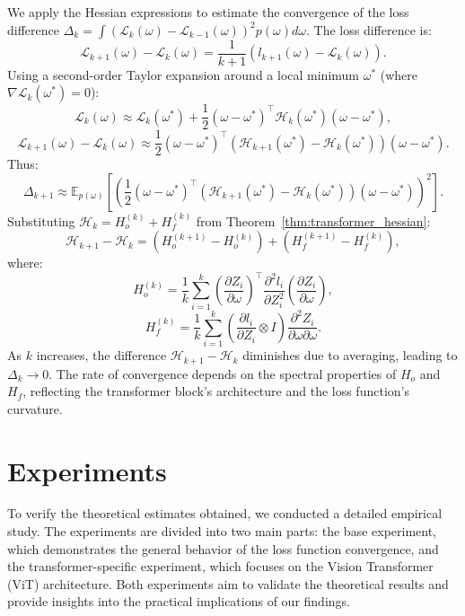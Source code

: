 \documentclass{article}
\begin{document}
We apply the Hessian expressions to estimate the convergence of the loss difference \( \Delta_k = \int ( \mathcal{L}_k(\omega) - \mathcal{L}_{k-1}(\omega) )^2 p(\omega) d\omega \). The loss difference is:
\[
\mathcal{L}_{k+1}(\omega) - \mathcal{L}_k(\omega) = \frac{1}{k+1} \left( l_{k+1}(\omega) - \mathcal{L}_k(\omega) \right).
\]
Using a second-order Taylor expansion around a local minimum \( \omega^* \) (where \( \nabla \mathcal{L}_k(\omega^*) = 0 \)):
\[
\mathcal{L}_k(\omega) \approx \mathcal{L}_k(\omega^*) + \frac{1}{2} (\omega - \omega^*)^\top \mathcal{H}_k(\omega^*) (\omega - \omega^*),
\]
\[
\mathcal{L}_{k+1}(\omega) - \mathcal{L}_k(\omega) \approx \frac{1}{2} (\omega - \omega^*)^\top ( \mathcal{H}_{k+1}(\omega^*) - \mathcal{H}_k(\omega^*) ) (\omega - \omega^*).
\]
Thus:
\[
\Delta_{k+1} \approx \mathbb{E}_{p(\omega)} \left[ \left( \frac{1}{2} (\omega - \omega^*)^\top ( \mathcal{H}_{k+1}(\omega^*) - \mathcal{H}_k(\omega^*) ) (\omega - \omega^*) \right)^2 \right].
\]
Substituting \( \mathcal{H}_k = H_o^{(k)} + H_f^{(k)} \) from Theorem~\ref{thm:transformer_hessian}:
\[
\mathcal{H}_{k+1} - \mathcal{H}_k = ( H_o^{(k+1)} - H_o^{(k)} ) + ( H_f^{(k+1)} - H_f^{(k)} ),
\]
where:
\[
H_o^{(k)} = \frac{1}{k} \sum_{i=1}^k \left( \frac{\partial Z_i}{\partial \omega} \right)^\top \frac{\partial^2 l_i}{\partial Z_i^2} \left( \frac{\partial Z_i}{\partial \omega} \right),
\]
\[
H_f^{(k)} = \frac{1}{k} \sum_{i=1}^k \left( \frac{\partial l_i}{\partial Z_i} \otimes I \right) \frac{\partial^2 Z_i}{\partial \omega \partial \omega}.
\]
As \( k \) increases, the difference \( \mathcal{H}_{k+1} - \mathcal{H}_k \) diminishes due to averaging, leading to \( \Delta_k \to 0 \). The rate of convergence depends on the spectral properties of \( H_o \) and \( H_f \), reflecting the transformer block’s architecture and the loss function’s curvature.

\section{Experiments}\label{sec:exp}

To verify the theoretical estimates obtained, we conducted a detailed empirical study. The experiments are divided into two main parts: the base experiment, which demonstrates the general behavior of the loss function convergence, and the transformer-specific experiment, which focuses on the Vision Transformer (ViT) architecture. Both experiments aim to validate the theoretical results and provide insights into the practical implications of our findings.
\end{document}
